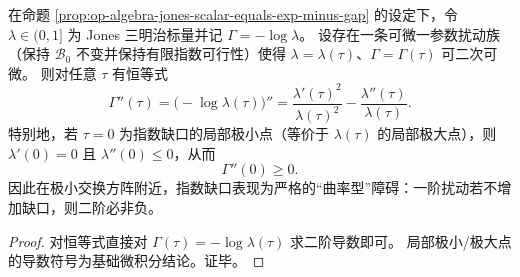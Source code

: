\begin{corollary}\label{cor:op-algebra-index-gap-curvature-second-variation}
在命题 \ref{prop:op-algebra-jones-scalar-equals-exp-minus-gap} 的设定下，令 \(\lambda\in(0,1]\) 为 Jones 三明治标量并记 \(\Gamma=-\log\lambda\)。
设存在一条可微一参数扰动族（保持 \(\mathcal{B}_0\) 不变并保持有限指数可行性）使得 \(\lambda=\lambda(\tau)\)、\(\Gamma=\Gamma(\tau)\) 可二次可微。
则对任意 \(\tau\) 有恒等式
\[
\boxed{\;
\Gamma''(\tau)=\bigl(-\log\lambda(\tau)\bigr)''=\frac{\lambda'(\tau)^2}{\lambda(\tau)^2}-\frac{\lambda''(\tau)}{\lambda(\tau)}.\;}
\]
特别地，若 \(\tau=0\) 为指数缺口的局部极小点（等价于 \(\lambda(\tau)\) 的局部极大点），则 \(\lambda'(0)=0\) 且 \(\lambda''(0)\le 0\)，从而
\[
\boxed{\;\Gamma''(0)\ge 0.\;}
\]
因此在极小交换方阵附近，指数缺口表现为严格的“曲率型”障碍：一阶扰动若不增加缺口，则二阶必非负。
\end{corollary}
\begin{proof}
对恒等式直接对 \(\Gamma(\tau)=-\log\lambda(\tau)\) 求二阶导数即可。
局部极小/极大点的导数符号为基础微积分结论。证毕。
\end{proof}


